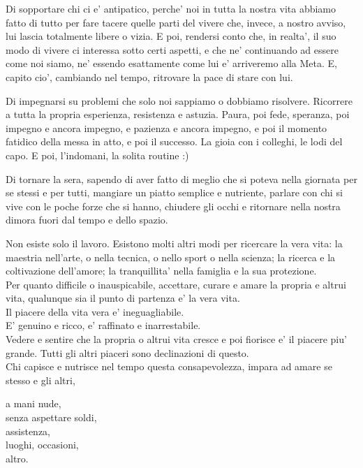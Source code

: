 Di sopportare chi ci e' antipatico, perche' noi in tutta la nostra vita abbiamo fatto di tutto per fare tacere quelle parti del vivere che, invece, a nostro avviso, lui lascia totalmente libere o vizia. E poi, rendersi conto che, in realta', il suo modo di vivere ci interessa sotto certi aspetti, e che ne' continuando ad essere come noi siamo, ne' essendo esattamente come lui e' arriveremo alla Meta. E, capito cio', cambiando nel tempo, ritrovare la pace di stare con lui.

Di impegnarsi su problemi che solo noi sappiamo o dobbiamo risolvere. Ricorrere a tutta la propria esperienza, resistenza e astuzia. Paura, poi fede, speranza, poi impegno e ancora impegno, e pazienza e ancora impegno, e poi il momento fatidico della messa in atto, e poi il successo. La gioia con i colleghi, le lodi del capo. E poi, l'indomani, la solita routine :)

Di tornare la sera, sapendo di aver fatto di meglio che si poteva nella giornata per se stessi e per tutti, mangiare un piatto semplice e nutriente, parlare con chi si vive con le poche forze che si hanno, chiudere gli occhi e ritornare nella nostra dimora fuori dal tempo e dello spazio.

Non esiste solo il lavoro. Esistono molti altri modi per ricercare la vera vita: la maestria nell'arte, o nella tecnica, o nello sport o nella scienza; la ricerca e la coltivazione dell'amore; la tranquillita' nella famiglia e la sua protezione.\\

Per quanto difficile o inauspicabile, accettare, curare e amare la propria e altrui vita, qualunque sia il punto di partenza e' la vera vita.\\

Il piacere della vita vera e' ineguagliabile.\\
E' genuino e ricco, e' raffinato e inarrestabile.\\

Vedere e sentire che la propria o altrui vita cresce e poi fiorisce e' il piacere piu' grande.
Tutti gli altri piaceri sono declinazioni di questo.\\

Chi capisce e nutrisce nel tempo questa consapevolezza, impara ad amare se stesso e gli altri,

\begin{poem}
a mani nude,\\
senza aspettare soldi,\\
assistenza,\\
luoghi, occasioni,\\
altro.\\
\end{poem}

